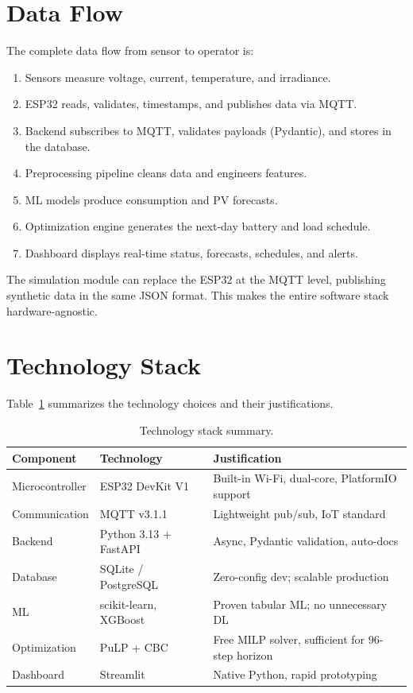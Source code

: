 \section{Data Flow}

The complete data flow from sensor to operator is:

\begin{enumerate}[nosep]
    \item Sensors measure voltage, current, temperature, and irradiance.
    \item ESP32 reads, validates, timestamps, and publishes data via MQTT.
    \item Backend subscribes to MQTT, validates payloads (Pydantic), and stores in the database.
    \item Preprocessing pipeline cleans data and engineers features.
    \item ML models produce consumption and PV forecasts.
    \item Optimization engine generates the next-day battery and load schedule.
    \item Dashboard displays real-time status, forecasts, schedules, and alerts.
\end{enumerate}

The simulation module can replace the ESP32 at the MQTT level, publishing synthetic data in the same JSON format. This makes the entire software stack hardware-agnostic.

\section{Technology Stack}

Table~\ref{tab:stack} summarizes the technology choices and their justifications.

\begin{table}[H]
\centering
\caption{Technology stack summary.}
\label{tab:stack}
\begin{tabularx}{\textwidth}{llX}
\toprule
\textbf{Component} & \textbf{Technology} & \textbf{Justification} \\
\midrule
Microcontroller & ESP32 DevKit V1 & Built-in Wi-Fi, dual-core, PlatformIO support \\
Communication & MQTT v3.1.1 & Lightweight pub/sub, IoT standard \\
Backend & Python 3.13 + FastAPI & Async, Pydantic validation, auto-docs \\
Database & SQLite / PostgreSQL & Zero-config dev; scalable production \\
ML & scikit-learn, XGBoost & Proven tabular ML; no unnecessary DL \\
Optimization & PuLP + CBC & Free MILP solver, sufficient for 96-step horizon \\
Dashboard & Streamlit & Native Python, rapid prototyping \\
\bottomrule
\end{tabularx}
\end{table}
